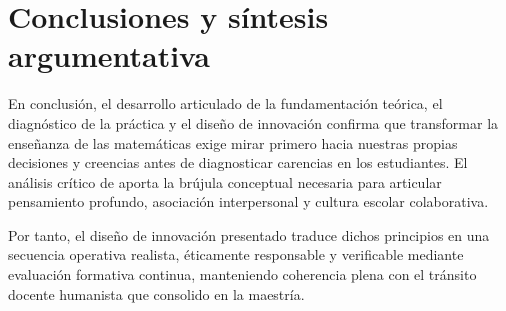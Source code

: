 \documentclass[spanish,letterpaper,oneside]{article}
\begin{document}
\clearpage
\section{Conclusiones y síntesis argumentativa}
En conclusión, el desarrollo articulado de la fundamentación teórica, el diagnóstico de la práctica y el diseño de innovación confirma que transformar la enseñanza de las matemáticas exige mirar primero hacia nuestras propias decisiones y creencias antes de diagnosticar carencias en los estudiantes. El análisis crítico de \citet{quiroga2022aprendizaje} aporta la brújula conceptual necesaria para articular pensamiento profundo, asociación interpersonal y cultura escolar colaborativa.

Por tanto, el diseño de innovación presentado traduce dichos principios en una secuencia operativa realista, éticamente responsable y verificable mediante evaluación formativa continua, manteniendo coherencia plena con el tránsito docente humanista que consolido en la maestría.
\end{document}

